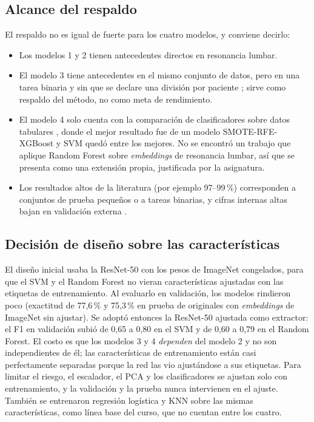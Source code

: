 \subsection{Alcance del respaldo}
El respaldo no es igual de fuerte para los cuatro modelos, y conviene decirlo:
\begin{itemize}
  \item Los modelos 1 y 2 tienen antecedentes directos en resonancia lumbar.
  \item El modelo 3 tiene antecedentes en el mismo conjunto de datos, pero en una tarea binaria y sin que se declare una división por paciente \cite{sari2024}; sirve como respaldo del método, no como meta de rendimiento.
  \item El modelo 4 solo cuenta con la comparación de clasificadores sobre datos tabulares \cite{peerj2023}, donde el mejor resultado fue de un modelo SMOTE-RFE-XGBoost y SVM quedó entre los mejores. No se encontró un trabajo que aplique Random Forest sobre \emph{embeddings} de resonancia lumbar, así que se presenta como una extensión propia, justificada por la asignatura.
  \item Los resultados altos de la literatura (por ejemplo 97--99\,\%) corresponden a conjuntos de prueba pequeños o a tareas binarias, y cifras internas altas bajan en validación externa \cite{yi2023}.
\end{itemize}

\subsection{Decisión de diseño sobre las características}
El diseño inicial usaba la ResNet-50 con los pesos de ImageNet congelados, para que el SVM y el Random Forest no vieran características ajustadas con las etiquetas de entrenamiento. Al evaluarlo en validación, los modelos rindieron poco (exactitud de 77,6\,\% y 75,3\,\% en prueba de originales con \emph{embeddings} de ImageNet sin ajustar). Se adoptó entonces la ResNet-50 ajustada como extractor: el F1 en validación subió de 0,65 a 0,80 en el SVM y de 0,60 a 0,79 en el Random Forest. El costo es que los modelos 3 y 4 \emph{dependen} del modelo 2 y no son independientes de él; las características de entrenamiento están casi perfectamente separadas porque la red las vio ajustándose a sus etiquetas. Para limitar el riesgo, el escalador, el PCA y los clasificadores se ajustan solo con entrenamiento, y la validación y la prueba nunca intervienen en el ajuste. También se entrenaron regresión logística y KNN sobre las mismas características, como línea base del curso, que no cuentan entre los cuatro.

